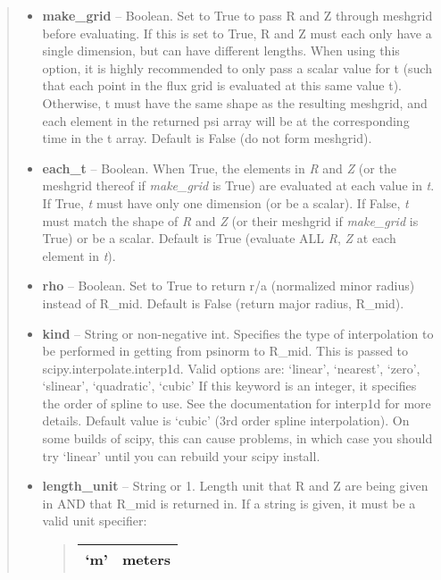 \documentclass[letterpaper,10pt,english]{sphinxmanual}
\begin{document}
\begin{fulllineitems}
\begin{fulllineitems}
\begin{quote}
\begin{description}
\begin{itemize}
\item {} 
\textbf{make\_grid} --
Boolean.
Set to True to pass R and Z through meshgrid
before evaluating. If this is set to True, R and Z must each
only have a single dimension, but can have different lengths.
When using this option, it is highly recommended to only pass
a scalar value for t (such that each point in the flux grid is
evaluated at this same value t). Otherwise, t must have the
same shape as the resulting meshgrid, and each element in the
returned psi array will be at the corresponding time in the t
array. Default is False (do not form meshgrid).

\item {} 
\textbf{each\_t} --
Boolean.
When True, the elements in \emph{R} and \emph{Z} (or the meshgrid thereof
if \emph{make\_grid} is True) are evaluated at each value in \emph{t}. If
True, \emph{t} must have only one dimension (or be a scalar). If
False, \emph{t} must match the shape of \emph{R} and \emph{Z} (or their
meshgrid if \emph{make\_grid} is True) or be a scalar. Default is True
(evaluate ALL \emph{R}, \emph{Z} at each element in \emph{t}).

\item {} 
\textbf{rho} --
Boolean.
Set to True to return r/a (normalized minor radius)
instead of R\_mid. Default is False (return major radius, R\_mid).

\item {} 
\textbf{kind} --
String or non-negative int.
Specifies the type of interpolation
to be performed in getting from psinorm to R\_mid. This is
passed to scipy.interpolate.interp1d. Valid options are:
`linear', `nearest', `zero', `slinear', `quadratic', `cubic'
If this keyword is an integer, it specifies the order of spline
to use. See the documentation for interp1d for more details.
Default value is `cubic' (3rd order spline interpolation). On
some builds of scipy, this can cause problems, in which case
you should try `linear' until you can rebuild your scipy install.

\item {} 
\textbf{length\_unit} --
String or 1.
Length unit that R and Z are being given
in AND that R\_mid is returned in. If a string is given, it
must be a valid unit specifier:
\begin{quote}

\begin{tabulary}{\linewidth}{|L|L|}
\hline

`m'
 & 
meters
\\\hline


\end{tabulary}
\end{quote}
\end{itemize}
\end{description}
\end{quote}
\end{fulllineitems}
\end{fulllineitems}
\end{document}
